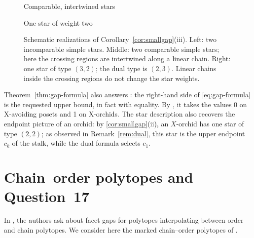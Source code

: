 \documentclass[a4paper, 11pt]{amsart}
\theoremstyle{definition}
\theoremstyle{remark}
\begin{document}
\begin{figure}[H]
\begin{minipage}[t]{0.32\textwidth}
\smallskip
Comparable, intertwined stars
\end{minipage}\hfill
\begin{minipage}[t]{0.32\textwidth}
\centering
{}

\smallskip
One star of weight two
\end{minipage}
\caption{Schematic realizations of Corollary~\ref{cor:smallgap}(iii). Left: two incomparable simple stars. Middle: two comparable simple stars; here the crossing regions are intertwined along a linear chain. Right: one star of type $(3,2)$; the dual type is $(2,3)$. Linear chains inside the crossing regions do not change the star weights.}
\label{fig:gap2}
\end{figure}

Theorem~\ref{thm:gap-formula} also answers \cite[Question~16]{BhandariEtAl2025}: the right-hand side of \eqref{eq:gap-formula} is the requested upper bound, in fact with equality. By \cite[Theorems~12 and~14]{BhandariEtAl2025}, it takes the values 0 on X-avoiding posets and 1 on X-orchids.
The star description also recovers the endpoint picture of an orchid: by \cref{cor:smallgap}(ii), an $X$-orchid has one star of type $(2,2)$; as observed in Remark~\ref{rem:dual}, this star is the upper endpoint $c_k$ of the stalk, while the dual formula selects $c_1$.

\section{Chain--order polytopes and Question~17}\label{sec:q17}

In \cite[Question~17]{BhandariEtAl2025}, the authors ask about facet
gaps for polytopes interpolating between order and chain polytopes.
We consider here the marked chain--order polytopes of
\cite{FangFourier2016}.
\end{document}
